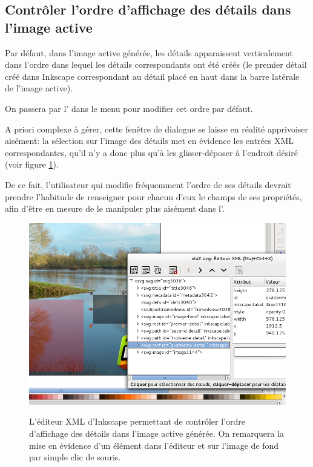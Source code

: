 {\subsection{Contrôler l'ordre d'affichage des détails dans l'image active}

Par défaut, dans l'image active générée, les détails apparaissent verticalement dans l'ordre 
dans lequel les détails correspondants ont été créés (le premier détail créé dans Inkscape 
correspondant au détail placé en haut dans la barre latérale de l'image active).

On passera par l' dans le menu  pour modifier cet 
ordre par défaut.

A priori complexe à gérer, cette fenêtre de dialogue se laisse en réalité apprivoiser aisément: 
la sélection sur l'image des détails met en évidence les entrées XML correspondantes, qu'il n'y 
a donc plus qu'à les glisser-déposer à l'endroit désiré (voir figure \ref{ordre_couches}).

De ce fait, l'utilisateur qui modifie fréquemment l'ordre de ses détails devrait prendre l'habitude 
de renseigner pour chacun d'eux le champs  de ses propriétés, afin d'être en mesure 
de le manipuler plus aisément dans l'.

\begin{figure}[htp]
 \centering
 \caption{L'éditeur XML d'Inkscape permettant de contrôler l'ordre d'affichage des détails dans l'image 
 active générée. On remarquera la mise en évidence d'un élément dans l'éditeur et sur l'image de fond 
 par simple clic de souris.}
 \includegraphics[width=\textwidth]{images/ordre_couches}
 \label{ordre_couches}
\end{figure}

}
